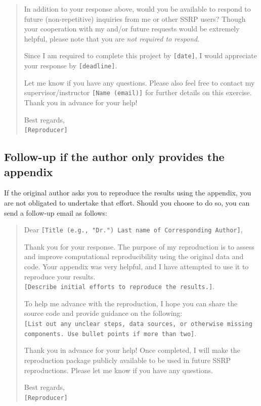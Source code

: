 \documentclass[
]{book}
\begin{document}
\begin{quote}
In addition to your response above, would you be available to respond to future (non-repetitive) inquiries from me or other SSRP users? Though your cooperation with my and/or future requests would be extremely helpful, please note that you are \emph{not required to respond}.

Since I am required to complete this project by \texttt{{[}date{]}}, I would appreciate your response by \texttt{{[}deadline{]}}.

Let me know if you have any questions. Please also feel free to contact my supervisor/instructor \texttt{{[}Name\ (email){]}} for further details on this exercise. Thank you in advance for your help!

Best regards,\\
\texttt{{[}Reproducer{]}}
\end{quote}

\hypertarget{follow-up-if-the-author-only-provides-the-appendix}{%
\subsection{Follow-up if the author only provides the appendix}\label{follow-up-if-the-author-only-provides-the-appendix}}

If the original author asks you to reproduce the results using the appendix, you are not obligated to undertake that effort. Should you choose to do so, you can send a follow-up email as follows:

\begin{quote}
Dear \texttt{{[}Title\ (e.g.,\ "Dr.")\ Last\ name\ of\ Corresponding\ Author{]}},

Thank you for your response. The purpose of my reproduction is to assess and improve computational reproducibility using the original data and code. Your appendix was very helpful, and I have attempted to use it to reproduce your results.\texttt{{[}Describe\ initial\ efforts\ to\ reproduce\ the\ results.{]}}.

To help me advance with the reproduction, I hope you can share the source code and provide guidance on the following: \texttt{{[}List\ out\ any\ unclear\ steps,\ data\ sources,\ or\ otherwise\ missing\ components.\ Use\ bullet\ points\ if\ more\ than\ two{]}}.

Thank you in advance for your help! Once completed, I will make the reproduction package publicly available to be used in future SSRP reproductions. Please let me know if you have any questions.

Best regards,\\
\texttt{{[}Reproducer{]}}
\end{quote}
\end{document}
